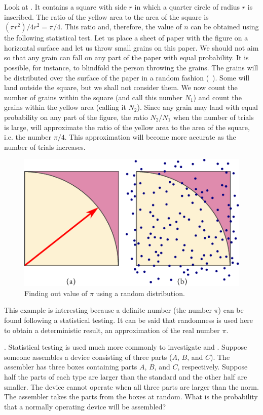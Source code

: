 Look at . It contains a square with side $r$ in which a quarter circle of radius $r$ is inscribed. The ratio of the yellow area to the area of the square is $(\pi r^{2})/4r^{2} = \pi /4$. This ratio and, therefore, the value of $n$ can be obtained using the following statistical test. Let us place a sheet of paper with the figure on a horizontal surface and let us throw small grains on this paper. We should not aim so that any grain
can fall on any part of the paper with equal probability. It is possible,
for instance, to blindfold the person throwing the grains. The grains will
be distributed over the surface of the paper in a random fashion
(~). Some will land outside the square, but we shall not consider them. We now count the number of grains within the square (and call
this number $N_{1}$) and count the grains within the yellow area (calling it
$N_{2}$). Since any grain may land with equal probability on any part of the
figure, the ratio $N_{2}/N_{1}$ when the number of trials is large, will
approximate the ratio of the yellow area to the area of the square, i.e.
the number $\pi /4$. This approximation will become more accurate as the
number of trials increases.
 \begin{figure}[!h]
 \centering
 \includegraphics[width=0.85\tfwidth]{figures/monte-carlo1.pdf}
\caption{Finding out value of $\pi$ using a random distribution.\label{monte-carlo1}}
 \end{figure}
This example is interesting because a definite number (the number $\pi$)
can be found following a statistical testing. It can be said that
randomness is used here to obtain a deterministic result, an
approximation of the real number $\pi$.


. Statistical testing is used much more commonly to
investigate  and . Suppose someone
assembles a device consisting of three parts ($A$, $B$, and $C$). The assembler
has three boxes containing parts $A$, $B$, and $C$, respectively. Suppose half
the parts of each type are larger than the standard and the other half
are smaller. The device cannot operate when all three parts are larger
than the norm. The assembler takes the parts from the boxes at random.
What is the probability that a normally operating device will be
assembled?

